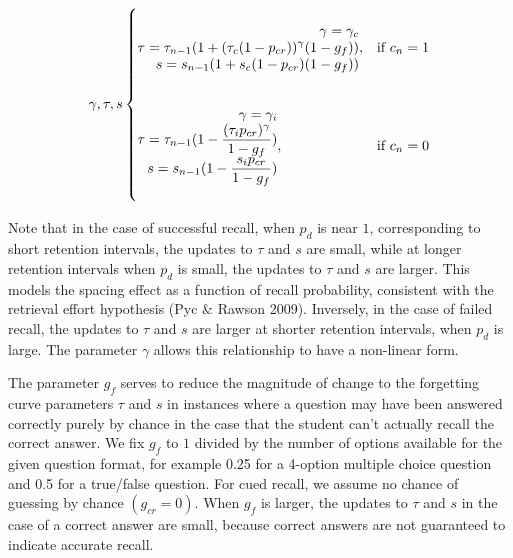 \documentclass[a4paper,12pt]{article}
\begin{document}
\begin{equation}
\begin{split} 
\gamma, \tau, s 
\begin{cases}
    \begin{split}
    \hspace{20 mm} \\
    \gamma = \gamma_c \\
    \tau = \tau_{n - 1} ( 1 + ( \tau_c (1 - p_{cr}) ) ^ \gamma ( 1 - g_f ) ) \\
    s = s_{n - 1} ( 1 + s_c (1 - p_{cr}) ( 1 - g_f ) ) \\
    \hspace{20 mm}
    \end{split}
    ,& \text{if } c_n = 1\\
    \begin{split}
    \hspace{20 mm} \\
    \gamma = \gamma_i \\
    \tau = \tau_{n - 1} ( 1 - \frac{( \tau_i p_{cr} ) ^ \gamma}{ 1 - g_f }) \\
    s = s_{n - 1} ( 1 - \frac{s_i p_{cr}}{1 - g_f} )\\
    \hspace{20 mm}
    \end{split}
    ,& \text{if } c_n = 0
\end{cases}
\end{split}
\end{equation}
	
Note that in the case of successful recall, when $p_d$ is near $1$, corresponding to short retention intervals, the updates to $\tau$ and $s$ are small, while at longer retention intervals when $p_d$ is small, the updates to $\tau$ and $s$ are larger. This models the spacing effect as a function of recall probability, consistent with the retrieval effort hypothesis (Pyc \& Rawson 2009). Inversely, in the case of failed recall, the updates to $\tau$ and $s$ are larger at shorter retention intervals, when $p_d$ is large. The parameter $\gamma$ allows this relationship to have a non-linear form.
	
The parameter $g_f$ serves to reduce the magnitude of change to the forgetting curve parameters $\tau$ and $s$ in instances where a question may have been answered correctly purely by chance in the case that the student can't actually recall the correct answer. We fix $g_f$ to $1$ divided by the number of options available for the given question format, for example 0.25 for a 4-option multiple choice question and 0.5 for a true/false question. For cued recall, we assume no chance of guessing by chance $(g_{cr}=0)$. When $g_f$ is larger, the updates to $\tau$ and $s$ in the case of a correct answer are small, because correct answers are not guaranteed to indicate accurate recall.
\end{document}
